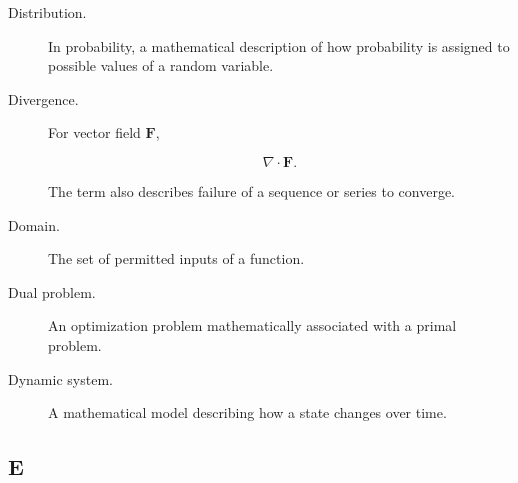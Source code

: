 \begin{description}
\item[Distribution.]
In probability, a mathematical description of how probability is assigned
to possible values of a random variable.

\item[Divergence.]
For vector field \(\mathbf{F}\),

\[
\nabla\cdot\mathbf{F}.
\]

The term also describes failure of a sequence or series to converge.

\item[Domain.]
The set of permitted inputs of a function.

\item[Dual problem.]
An optimization problem mathematically associated with a primal problem.

\item[Dynamic system.]
A mathematical model describing how a state changes over time.

\end{description}

\subsection*{E}

